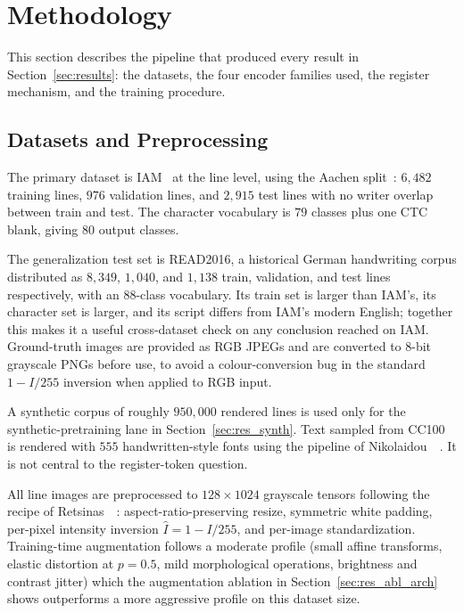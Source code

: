\section{Methodology}
\label{sec:methodology}

This section describes the pipeline that produced every result in Section~\ref{sec:results}: the datasets, the four encoder families used, the register mechanism, and the training procedure.

\subsection{Datasets and Preprocessing}
\label{sec:datasets}

The primary dataset is IAM~\cite{marti2002iam} at the line level, using the Aachen split~\cite{retsinas2024htrbestpractices}: $6{,}482$ training lines, $976$ validation lines, and $2{,}915$ test lines with no writer overlap between train and test. The character vocabulary is $79$ classes plus one CTC blank, giving $80$ output classes.

The generalization test set is READ2016, a historical German handwriting corpus distributed as $8{,}349$, $1{,}040$, and $1{,}138$ train, validation, and test lines respectively, with an $88$-class vocabulary. Its train set is larger than IAM's, its character set is larger, and its script differs from IAM's modern English; together this makes it a useful cross-dataset check on any conclusion reached on IAM. Ground-truth images are provided as RGB JPEGs and are converted to 8-bit grayscale PNGs before use, to avoid a colour-conversion bug in the standard $1 - I/255$ inversion when applied to RGB input.

A synthetic corpus of roughly $950{,}000$ rendered lines is used only for the synthetic-pretraining lane in Section~\ref{sec:res_synth}. Text sampled from CC100 is rendered with $555$ handwritten-style fonts using the pipeline of Nikolaidou~\etal~\cite{nikolaidou2023wordstylist}. It is not central to the register-token question.

All line images are preprocessed to $128 \times 1024$ grayscale tensors following the recipe of Retsinas~\etal~\cite{retsinas2024htrbestpractices}: aspect-ratio-preserving resize, symmetric white padding, per-pixel intensity inversion $\hat I = 1 - I/255$, and per-image standardization. Training-time augmentation follows a moderate profile (small affine transforms, elastic distortion at $p{=}0.5$, mild morphological operations, brightness and contrast jitter) which the augmentation ablation in Section~\ref{sec:res_abl_arch} shows outperforms a more aggressive profile on this dataset size.


